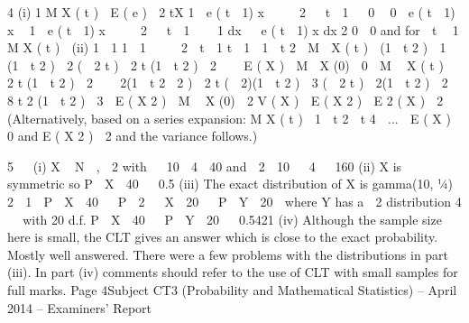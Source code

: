 \documentclass[a4paper,12pt]{article}
\begin{document}
4
(i)
1
M X ( t )  E ( e ) 
2
tX
1  e ( t  1) x 
 

2   t  1  
0

0
 e
( t  1) x

1  e ( t  1) x 
 

2   t  1  

1
dx   e ( t  1) x dx
2
0

0
and for  t  1
M X ( t ) 
(ii)
1  1
1 
1


 
2  t  1 t  1  1  t 2

M  X ( t )  (1  t 2 )  1   (1  t 2 )  2 (  2 t )  2 t (1  t 2 )  2


 E ( X )  M  X (0)  0

M  X ( t )  2 t (1  t 2 )  2

  2(1  t
2  2
)
 2 t (  2)(1  t 2 )  3 (  2 t )
 2(1  t 2 )  2  8 t 2 (1  t 2 )  3
 E ( X 2 )  M  X (0)  2
V ( X )  E ( X 2 )  E 2 ( X )  2
(Alternatively, based on a series expansion:
M X ( t )  1  t 2  t 4  ...  E ( X )  0 and E ( X 2 )  2 and the variance follows.)

5


(i) X ~ N  ,  2 with   10  4  40 and  2  10   4   160
(ii) X is symmetric so P  X  40   0.5
(iii) The exact distribution of X is gamma(10, 1⁄4)
2
 1

P  X  40   P  2   X  20   P  Y  20  where Y has a  2 distribution
4


with 20 d.f.
P  X  40   P  Y  20   0.5421
(iv)
Although the sample size here is small, the CLT gives an answer which is
close to the exact probability.
Mostly well answered. There were a few problems with the distributions in part (iii). In part
(iv) comments should refer to the use of CLT with small samples for full marks.
Page 4Subject CT3 (Probability and Mathematical Statistics) – April 2014 – Examiners’ Report
\end{document}
